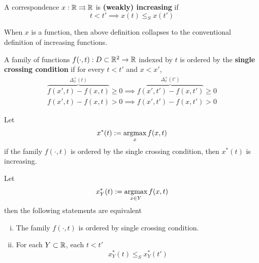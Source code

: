 \documentclass{report}
\begin{document}
			\begin{definition}
				A correspondence $x: \mathbb{R} \rightrightarrows \mathbb{R}$ is \textbf{(weakly) increasing} if 
				\begin{equation}
					t < t' \implies x(t) \leq_S x(t')
				\end{equation}
			\end{definition}
			
			\begin{remark}
				When $x$ is a function, then above definition collapses to the conventional definition of increasing functions.
			\end{remark}
		
			\begin{definition}
				A family of functions $f(\cdot, t): D \subset \mathbb{R}^2 \to \mathbb{R}$ indexed by $t$ is ordered by the \textbf{single crossing condition} if for every $t < t'$ and $x < x'$,
				\begin{align}
					\overbrace{f(x', t) - f(x, t)}^{\Delta^+_x(t)} \geq 0 \implies \overbrace{f(x', t') - f(x, t')}^{\Delta^+_x(t')} \geq 0 \\
					f(x', t) - f(x, t) > 0 \implies f(x', t') - f(x, t') > 0
				\end{align}
			\end{definition}
			
			\begin{theorem}
				Let 
				\begin{equation}
					x^*(t) := \operatorname*{argmax}_x f(x, t)
				\end{equation}
				if the family $f(\cdot, t)$ is ordered by the single crossing condition, then $x^*(t)$ is increasing.
			\end{theorem}
			
			\begin{theorem}
				Let
				\begin{equation}
					x_Y^*(t) := \operatorname*{argmax}_{x \in Y} f(x, t)
				\end{equation}
				then the following statements are equivalent
				\begin{enumerate}[(i)]
					\item The family $f(\cdot, t)$ is ordered by single crossing condition.
					\item For each $Y \subset \mathbb{R}$, each $t < t'$
					\begin{equation}
						x_Y^*(t) \leq_S x_Y^*(t')
					\end{equation}
				\end{enumerate}
			\end{theorem}
			
\end{document}
